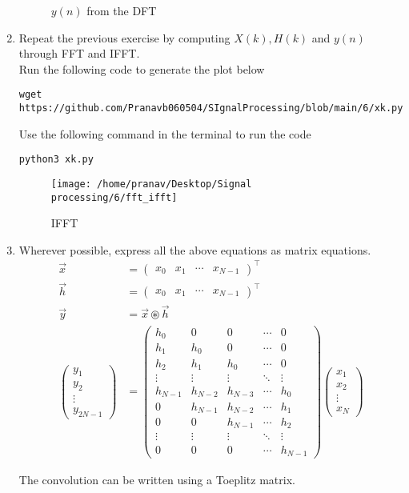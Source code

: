 \documentclass[journal,12pt,twocolumn]{IEEEtran}
\newcommand{\myvec}[1]{\ensuremath{\begin{pmatrix}#1\end{pmatrix}}}
\renewcommand\thesection{\arabic{section}}
\begin{document}
\begin{enumerate}[label=\thesection.\arabic*]
\begin{figure}[!ht]
\caption{$y(n)$ from the DFT}
\label{fig:yndft}
\end{figure}
\item Repeat the previous exercise by computing $X(k), H(k)$ and $y(n)$ through FFT and 
IFFT.\\
\solution 
Run the following code to generate the plot below
\begin{lstlisting}
wget https://github.com/Pranavb060504/SIgnalProcessing/blob/main/6/xk.py
\end{lstlisting}
Use the following command in the terminal to run the code
\begin{lstlisting}
python3 xk.py
\end{lstlisting}
\begin{figure}[!ht]
\centering
\texttt{[image: /home/pranav/Desktop/Signal processing/6/fft\_ifft]}
\caption{IFFT}
\label{fig:fft_ifft}
\end{figure}
\item Wherever possible, express all the above equations as matrix equations.
\\
\solution 
\begin{align}
		\vec{x} &= \myvec{x_0 & x_1	 & \cdots & x_{N-1}}^\top \\
		\vec{h} &= \myvec{x_0 & x_1	 & \cdots & x_{N-1}}^\top \\
		\vec{y} &= \vec{x} \circledast \vec{h} \\
		\myvec{y_1 \\ y_2 \\ \vdots \\ y_{2N - 1}} &= \myvec{
			h_0 & 0 & 0 & \cdots & 0 \\
			h_1 & h_0 & 0 & \cdots & 0 \\
			h_2 & h_1 & h_0 & \cdots & 0 \\
			\vdots & \vdots & \vdots & \ddots & \vdots \\
			h_{N-1} & h_{N-2} & h_{N-3} & \cdots & h_0 \\
			0 & h_{N-1} & h_{N-2} & \cdots & h_1 \\
			0 & 0 & h_{N-1} & \cdots & h_2 \\
			\vdots & \vdots & \vdots & \ddots & \vdots \\
			0 & 0 & 0 & \cdots & h_{N-1}
		}		
		\myvec{x_1\\x_2\\ \vdots \\x_N}
	\end{align}
	
	The convolution can be written using a Toeplitz matrix. 
	

\end{enumerate}
\end{document}
